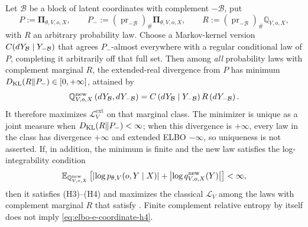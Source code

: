 Let \(\mathcal B\) be a block of latent coordinates with complement \(-\mathcal B\), put
\[
P:=\boldsymbol\Pi_{\theta,V,o,X},
\qquad
P_-:=(\operatorname{pr}_{-\mathcal B})_\#
\boldsymbol\Pi_{\theta,V,o,X},
\qquad
R:=(\operatorname{pr}_{-\mathcal B})_\#
\mathbb Q_{V,o,X},
\]
with $R$ an arbitrary probability law. Choose a Markov-kernel version $C(dY_{\mathcal B}\mid Y_{-\mathcal B})$ that agrees $P_-$-almost everywhere with a regular conditional law of $P$, completing it arbitrarily off that full set. Then among \emph{all} probability laws with complement marginal \(R\), the extended-real divergence from \(P\) has minimum \(D_{\mathrm{KL}}(R\Vert P_-)\in[0,+\infty]\), attained by
\begin{equation}
\mathbb Q_{V,o,X}^{\mathrm{new}}
\left(dY_{\mathcal B},dY_{-\mathcal B}\right)
=C\left(dY_{\mathcal B}\mid Y_{-\mathcal B}\right)
R\left(dY_{-\mathcal B}\right).
\label{eq:elbo-e-coordinate}
\end{equation}
It therefore maximizes \(\mathcal L_V^{\mathrm{ext}}\) on that marginal class. The minimizer is unique as a joint measure when \(D_{\mathrm{KL}}(R\Vert P_-)<\infty\); when this divergence is \(+\infty\), every law in the class has divergence \(+\infty\) and extended ELBO \(-\infty\), so uniqueness is not asserted. If, in addition, the minimum is finite and the new law satisfies the log-integrability condition
\begin{equation}
\mathbb E_{\mathbb Q_{V,o,X}^{\mathrm{new}}}\left[
\left|\log p_{\theta,V}(o,Y\mid X)\right|
+\left|\log q_{V,o,X}^{\mathrm{new}}(Y)\right|
\right]<\infty,
\label{eq:elbo-e-coordinate-h4}
\end{equation}
then it satisfies (H3)--(H4) and maximizes the classical \(\mathcal L_V\) among the laws with complement marginal \(R\) that satisfy . Finite complement relative entropy by itself does not imply \eqref{eq:elbo-e-coordinate-h4}.

